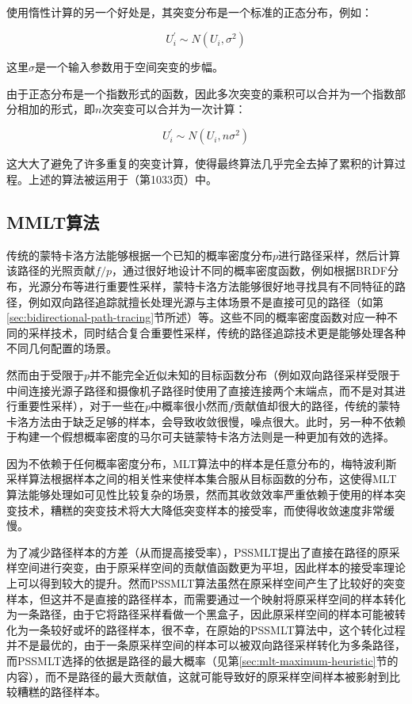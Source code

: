 使用惰性计算的另一个好处是，其突变分布是一个标准的正态分布，例如：

\begin{equation}
	U^{'}_i\sim N(U_i,\sigma^{2})
\end{equation}

\noindent 这里$\sigma$是一个输入参数用于空间突变的步幅。

由于正态分布是一个指数形式的函数，因此多次突变的乘积可以合并为一个指数部分相加的形式，即$n$次突变可以合并为一次计算：

\begin{equation}
	U^{'}_i\sim N(U_i,n\sigma^{2})
\end{equation}

这大大了避免了许多重复的突变计算，使得最终算法几乎完全去掉了累积的计算过程。上述的算法被运用于\cite{b:pbrt}（第1033页）中。




\subsection{MMLT算法}\label{sec:mlt-mmlt}
传统的蒙特卡洛方法能够根据一个已知的概率密度分布$p$进行路径采样，然后计算该路径的光照贡献$f/p$，通过很好地设计不同的概率密度函数，例如根据BRDF分布，光源分布等进行重要性采样，蒙特卡洛方法能够很好地寻找具有不同特征的路径，例如双向路径追踪就擅长处理光源与主体场景不是直接可见的路径（如第\ref{sec:bidirectional-path-tracing}节所述）等。这些不同的概率密度函数对应一种不同的采样技术，同时结合复合重要性采样，传统的路径追踪技术更是能够处理各种不同几何配置的场景。

然而由于受限于$p$并不能完全近似未知的目标函数分布（例如双向路径采样受限于中间连接光源子路径和摄像机子路径时使用了直接连接两个末端点，而不是对其进行重要性采样），对于一些在$p$中概率很小然而$f$贡献值却很大的路径，传统的蒙特卡洛方法由于缺乏足够的样本，会导致收敛很慢，噪点很大。此时，另一种不依赖于构建一个假想概率密度的马尔可夫链蒙特卡洛方法则是一种更加有效的选择。

因为不依赖于任何概率密度分布，MLT算法中的样本是任意分布的，梅特波利斯采样算法根据样本之间的相关性来使样本集合服从目标函数的分布，这使得MLT算法能够处理如可见性比较复杂的场景，然而其收敛效率严重依赖于使用的样本突变技术，糟糕的突变技术将大大降低突变样本的接受率，而使得收敛速度非常缓慢。

为了减少路径样本的方差（从而提高接受率），PSSMLT提出了直接在路径的原采样空间进行突变，由于原采样空间的贡献值函数更为平坦，因此样本的接受率理论上可以得到较大的提升。然而PSSMLT算法虽然在原采样空间产生了比较好的突变样本，但这并不是直接的路径样本，而需要通过一个映射将原采样空间的样本转化为一条路径，由于它将路径采样看做一个黑盒子，因此原采样空间的样本可能被转化为一条较好或坏的路径样本，很不幸，在原始的PSSMLT算法中，这个转化过程并不是最优的，由于一条原采样空间的样本可以被双向路径采样转化为多条路径，而PSSMLT选择的依据是路径的最大概率（见第\ref{sec:mlt-maximum-heuristic}节的内容），而不是路径的最大贡献值，这就可能导致好的原采样空间样本被影射到比较糟糕的路径样本。

